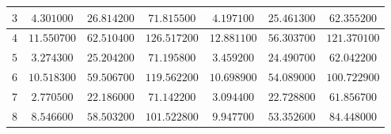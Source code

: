 \begin{landscape}
\begin{table}[]
\begin{tabular}{|c|c|c|c|c|c|c|}
$3$          & $4.301000$                                                   & $26.814200$                                                  & $71.815500$                                                  & $4.197100$                                                         & $25.461300$                                                        & \multicolumn{1}{c|}{$62.355200$}                                                        \\ \hline
$4$          & $11.550700$                                                  & $62.510400$                                                  & $126.517200$                                                 & $12.881100$                                                        & $56.303700$                                                        & \multicolumn{1}{c|}{$121.370100$}                                                       \\ \hline
$5$          & $3.274300$                                                   & $25.204200$                                                  & $71.195800$                                                  & $3.459200$                                                         & $24.490700$                                                        & \multicolumn{1}{c|}{$62.042200$}                                                        \\ \hline
$6$          & $10.518300$                                                  & $59.506700$                                                  & $119.562200$                                                 & $10.698900$                                                        & $54.089000$                                                        & \multicolumn{1}{c|}{$100.722900$}                                                       \\ \hline
$7$          & $2.770500$                                                   & $22.186000$                                                  & $71.142200$                                                  & $3.094400$                                                         & $22.728800$                                                        & \multicolumn{1}{c|}{$61.856700$}                                                        \\ \hline
$8$          & $8.546600$                                                   & $58.503200$                                                  & $101.522800$                                                 & $9.947700$                                                         & $53.352600$                                                        & \multicolumn{1}{c|}{$84.448000$}                                                        \\ \hline

\end{tabular}
\end{table}
\end{landscape}
